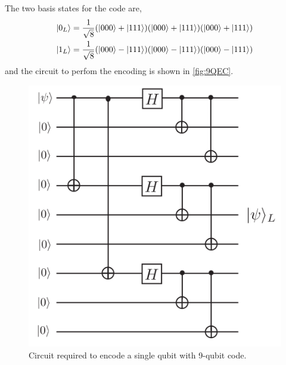 \documentclass[10pt,a4paper]{book}
\numberwithin{equation}{chapter}
\numberwithin{figure}{chapter}
\numberwithin{table}{chapter}
\begin{document}
The two basis states for the code are,
\begin{align}
\ket{0_L}&=\frac{1}{\sqrt{8}}(\ket{000}+\ket{111})(\ket{000}+\ket{111})(\ket{000}+\ket{111})\\
\ket{1_L}&=\frac{1}{\sqrt{8}}(\ket{000}-\ket{111})(\ket{000}-\ket{111})(\ket{000}-\ket{111})
\end{align}
and the circuit to perfom the encoding is shown in \autoref{fig:9QEC}. 
\begin{figure}[H]
    \begin{center}
        \includegraphics[scale=0.3]{9qubitQEC.png}
    \end{center}
    \caption{\footnotesize Circuit required to encode a single qubit with 9-qubit code.}
    \label{fig:9QEC}
\end{figure}
\end{document}
